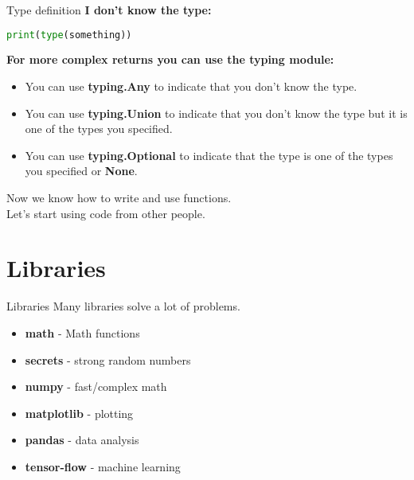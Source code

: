 \documentclass{beamer}
\begin{document}
\begin{frame}[fragile]{Type definition}
    \textbf{I don't know the type:}\\ \pause
    \begin{lstlisting}[backgroundcolor = \color{lightgray},language=Python]
        print(type(something))
    \end{lstlisting}
    \pause
    \textbf{For more complex returns you can use the typing module:}\\ \pause
    \begin{itemize}
        \item You can use \textbf{typing.Any} to indicate that you don't know the type.\\ \pause
        \item You can use \textbf{typing.Union} to indicate that you don't know the type but it is one of the types you specified.\\ \pause
        \item You can use \textbf{typing.Optional} to indicate that the type is one of the types you specified or \textbf{None}.\\ \pause
    \end{itemize}
\end{frame}

\begin{frame}
    Now we know how to write and use functions.\\ \pause
    Let's start using code from other people.
\end{frame}

\section{Libraries}

\begin{frame}{Libraries}
    Many libraries solve a lot of problems.\\ \pause
    \begin{itemize}
        \item \textbf{math} - Math functions
        \item \textbf{secrets} - strong random numbers
        \item \textbf{numpy} - fast/complex math
        \item \textbf{matplotlib} - plotting
        \item \textbf{pandas} - data analysis
        \item \textbf{tensor-flow} - machine learning
    \end{itemize}
\end{frame}
\end{document}
